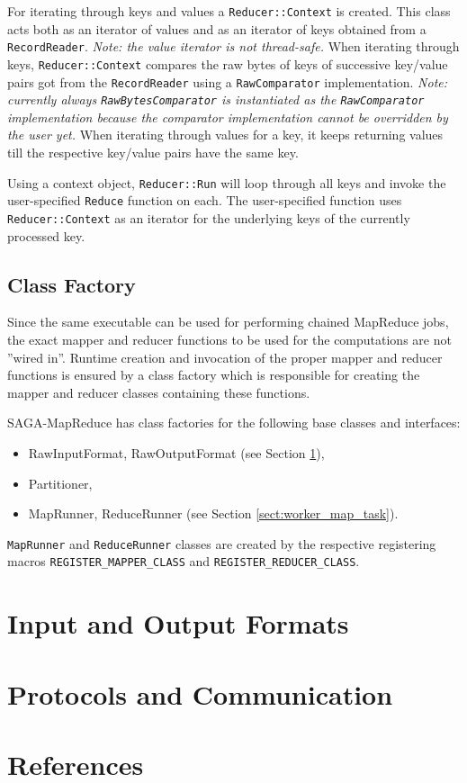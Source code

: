 \documentclass{article}
\begin{document}
For iterating through keys and values a \texttt{Reducer::Context} is created. This class acts both as an iterator of values and as an iterator of keys obtained from a \texttt{RecordReader}. \emph{Note: the value iterator is not thread-safe.} When iterating through keys, \texttt{Reducer::Context} compares the raw bytes of keys of successive key/value pairs got from the \texttt{RecordReader} using a \texttt{RawComparator} implementation. \emph{Note: currently always \texttt{RawBytesComparator} is instantiated as the \texttt{RawComparator} implementation because the comparator implementation cannot be overridden by the user yet.} When iterating through values for a key, it keeps returning values till the respective key/value pairs have the same key.

Using a context object, \texttt{Reducer::Run} will loop through all keys and invoke the user-specified \texttt{Reduce} function on each. The user-specified function uses \texttt{Reducer::Context} as an iterator for the underlying keys of the currently processed key.

\subsection{Class Factory}
\label{sect:class_factory}

Since the same executable can be used for performing chained MapReduce jobs, the exact mapper and reducer functions to be used for the computations are not ''wired in''. Runtime creation and invocation of the proper mapper and reducer functions is ensured by a class factory which is responsible for creating the mapper and reducer classes containing these functions.

SAGA-MapReduce has class factories for the following base classes and interfaces:
\begin{itemize}
  \item RawInputFormat, RawOutputFormat (see Section \ref{sect:input_output_formats}),
  \item Partitioner,
  \item MapRunner, ReduceRunner (see Section \ref{sect:worker_map_task}).
\end{itemize}

\texttt{MapRunner} and \texttt{ReduceRunner} classes are created by the respective registering macros \texttt{REGISTER\_MAPPER\_CLASS} and \texttt{REGISTER\_REDUCER\_CLASS}.


\section{Input and Output Formats}
\label{sect:input_output_formats}

\section{Protocols and Communication}
\label{sect:protocol}

\section{References}


\end{document}
